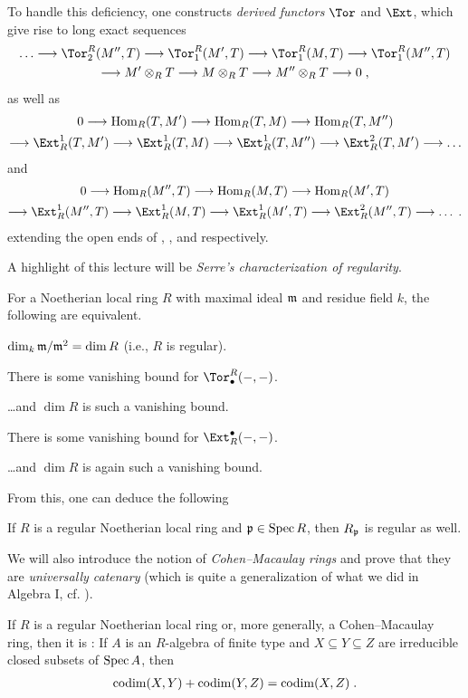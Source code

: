 \documentclass[a4paper,parskip=half,numbers=enddot, DIV=12]{scrreprt}
\begin{document}
To handle this deficiency, one constructs \emph{derived functors} $\Tor$ and $\Ext$, which give rise to long exact sequences
\begin{multline*}
	\ldots\morphism\Tor_2^R(M'',T)\morphism \Tor_1^R(M',T)\morphism \Tor_1^R(M,T)\morphism \Tor_1^R(M'',T)\\
	\morphism M'\otimes_RT\morphism M\otimes_RT\morphism M''\otimes_RT\morphism 0\;,
\end{multline*}
as well as
\begin{multline*}
	0\morphism\Hom_R(T,M')\morphism\Hom_R(T,M)\morphism\Hom_R(T,M'')\\
	\morphism\Ext_R^1(T,M')\morphism\Ext_R^1(T,M)\morphism\Ext_R^1(T,M'')\morphism\Ext_R^2(T,M')\morphism\ldots
\end{multline*}
and
\begin{multline*}
0\morphism\Hom_R(M'',T)\morphism\Hom_R(M,T)\morphism\Hom_R(M',T)\\
\morphism\Ext_R^1(M'',T)\morphism\Ext_R^1(M,T)\morphism\Ext_R^1(M',T)\morphism\Ext_R^2(M'',T)\morphism\ldots\;.
\end{multline*}
extending the open ends of , , and  respectively.

A highlight of this lecture will be \emph{Serre's characterization of regularity}.
\begin{thm*}
	For a  Noetherian local ring $R$ with maximal ideal $\mathfrak{m}$ and residue field $k$, the following are equivalent.
	\begin{alphanumerate}
		\item $\dim_k\mathfrak{m}/\mathfrak{m}^2=\dim R$ (i.e., $R$ is regular).
		\item There is some vanishing bound for $\Tor_\bullet ^R(-,-)$.
		\item \ldots and $\dim R$ is such a vanishing bound.
		\item There is some vanishing bound for $\Ext_R^\bullet (-,-)$.
		\item \ldots and $\dim R$ is again such a vanishing bound.
	\end{alphanumerate}
\end{thm*}
From this, one can deduce the following
\begin{cor*}
	If $R$ is a regular Noetherian local ring and $\mathfrak{p}\in\operatorname{Spec} R$, then $R_{\mathfrak{p}}$ is regular as well.
\end{cor*}

We will also introduce the notion of \emph{Cohen--Macaulay rings} and prove that they are \emph{universally catenary} (which is quite a generalization of what we did in Algebra I, cf. \cite[Theorem~10]{alg1}).
\begin{thm*}
	If $R$ is a regular Noetherian local ring or, more generally, a Cohen--Macaulay ring, then it is : If $A$ is an $R$-algebra of finite type and $X\subseteq Y\subseteq Z$ are irreducible closed subsets of $\operatorname{Spec} A$, then
	\begin{align*}
		\operatorname{codim}(X,Y)+\operatorname{codim}(Y,Z)=\operatorname{codim}(X,Z)\;.
	\end{align*}
\end{thm*}
\end{document}
